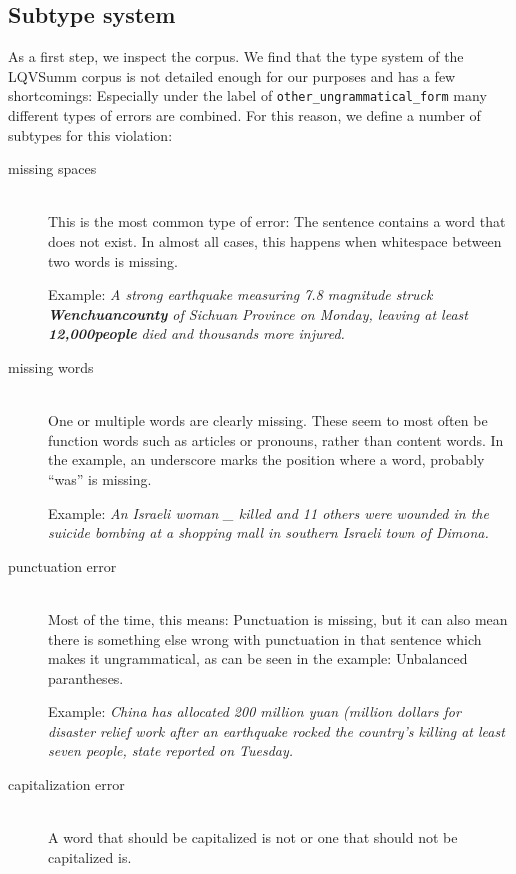 \documentclass[a4paper,10pt]{scrartcl}
\theoremstyle{style}
\begin{document}
\subsection{Subtype system}

As a first step, we inspect the corpus. We find that the type system of the LQVSumm corpus \citep{valeeva} is not detailed enough for our purposes and has a few shortcomings: Especially under the label of \texttt{other\_ungrammatical\_form} many different types of errors are combined. For this reason, we define a number of subtypes for this violation:

\begin{description}
\item[missing spaces] \hfill \\
	This is the most common type of error: The sentence contains a word that does not exist. In almost all cases, this happens when whitespace between two words is missing.

	Example: \textit{A strong earthquake measuring 7.8 magnitude struck \\\textbf{Wenchuancounty} of Sichuan Province on Monday, leaving at least \\\textbf{12,000people} died and thousands more injured.}

\item[missing words] \hfill \\
	One or multiple words are clearly missing. These seem to most often be function words such as articles or pronouns, rather than content words. In the example, an underscore marks the position where a word, probably ``was'' is missing.

	Example: \textit{An Israeli woman \_ killed and 11 others were wounded in the suicide bombing at a shopping mall in southern Israeli town of Dimona.}

\item[punctuation error] \hfill \\
	Most of the time, this means: Punctuation is missing, but it can also mean there is something else wrong with punctuation in that sentence which makes it ungrammatical, as can be seen in the example: Unbalanced parantheses.

	Example: \textit{China has allocated 200 million yuan (million dollars for disaster relief work after an earthquake rocked the country's killing at least seven people, state reported on Tuesday.}

\item[capitalization error] \hfill \\
	A word that should be capitalized is not or one that should not be capitalized is.


\end{description}
\end{document}
